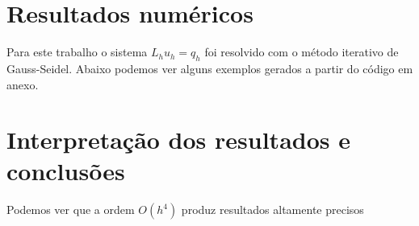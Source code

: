 \documentclass[]{article}
\newcounter{sol}[section]
\begin{document}
\section{Resultados numéricos}

Para este trabalho o sistema $L_h u_h = q_h$ foi resolvido com o método 
iterativo de Gauss-Seidel. Abaixo podemos ver alguns exemplos gerados a partir do código em anexo.



\section{Interpretação dos resultados e conclusões}

Podemos ver que a ordem $O(h^4)$ produz resultados altamente precisos


%  
% 
\end{document}
